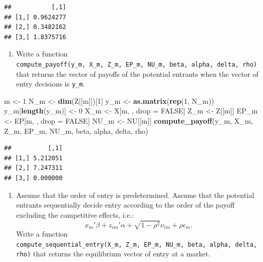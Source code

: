 \documentclass[]{book}
\newenvironment{Shaded}{\begin{snugshade}}{\end{snugshade}}
\newcommand{\KeywordTok}[1]{\textcolor[rgb]{0.13,0.29,0.53}{\textbf{#1}}}
\newcommand{\DecValTok}[1]{\textcolor[rgb]{0.00,0.00,0.81}{#1}}
\newcommand{\StringTok}[1]{\textcolor[rgb]{0.31,0.60,0.02}{#1}}
\newcommand{\OtherTok}[1]{\textcolor[rgb]{0.56,0.35,0.01}{#1}}
\newcommand{\NormalTok}[1]{#1}
\providecommand{\tightlist}{%
  \setlength{\itemsep}{0pt}\setlength{\parskip}{0pt}}
\begin{document}
\begin{verbatim}
##           [,1]
## [1,] 0.9624277
## [2,] 0.3482162
## [3,] 1.8375716
\end{verbatim}

\begin{enumerate}
\def\labelenumi{\arabic{enumi}.}
\setcounter{enumi}{3}
\tightlist
\item
  Write a function
  \texttt{compute\_payoff(y\_m,\ X\_m,\ Z\_m,\ EP\_m,\ NU\_m,\ beta,\ alpha,\ delta,\ rho)}
  that returns the vector of payoffs of the potential entrants when the
  vector of entry decisions is \texttt{y\_m}.
\end{enumerate}

\begin{Shaded}
\begin{Highlighting}[]
\NormalTok{m <-}\StringTok{ }\DecValTok{1}
\NormalTok{N_m <-}\StringTok{ }\KeywordTok{dim}\NormalTok{(Z[[m]])[}\DecValTok{1}\NormalTok{]}
\NormalTok{y_m <-}\StringTok{ }\KeywordTok{as.matrix}\NormalTok{(}\KeywordTok{rep}\NormalTok{(}\DecValTok{1}\NormalTok{, N_m))}
\NormalTok{y_m[}\KeywordTok{length}\NormalTok{(y_m)] <-}\StringTok{ }\DecValTok{0}
\NormalTok{X_m <-}\StringTok{ }\NormalTok{X[m, , drop =}\StringTok{ }\OtherTok{FALSE}\NormalTok{]}
\NormalTok{Z_m <-}\StringTok{ }\NormalTok{Z[[m]]}
\NormalTok{EP_m <-}\StringTok{ }\NormalTok{EP[m, , drop =}\StringTok{ }\OtherTok{FALSE}\NormalTok{]}
\NormalTok{NU_m <-}\StringTok{ }\NormalTok{NU[[m]]}
\KeywordTok{compute_payoff}\NormalTok{(y_m, X_m, Z_m, EP_m, NU_m, beta, alpha, delta, rho)}
\end{Highlighting}
\end{Shaded}

\begin{verbatim}
##          [,1]
## [1,] 5.212051
## [2,] 7.247311
## [3,] 0.000000
\end{verbatim}

\begin{enumerate}
\def\labelenumi{\arabic{enumi}.}
\setcounter{enumi}{4}
\tightlist
\item
  Assume that the order of entry is predetermined. Assume that the
  potential entrants sequentially decide entry according to the order of
  the payoff excluding the competitive effects, i.e.: \[
  x_m'\beta + z_{im}'\alpha + \sqrt{1 - \rho^2} \nu_{im} + \rho \epsilon_{m}.
  \] Write a function
  \texttt{compute\_sequential\_entry(X\_m,\ Z\_m,\ EP\_m,\ NU\_m,\ beta,\ alpha,\ delta,\ rho)}
  that returns the equilibrium vector of entry at a market.
\end{enumerate}
\end{document}
